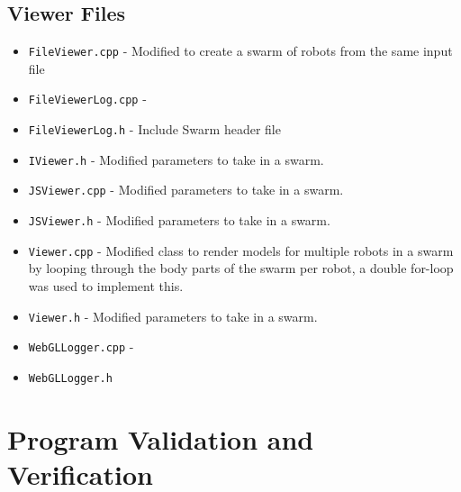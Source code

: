 \documentclass[11pt,a4paper]{article}
\begin{document}
\subsection{Viewer Files}
\begin{itemize}
    \item \texttt{FileViewer.cpp} - Modified to create a swarm of robots from
        the same input file
    \item \texttt{FileViewerLog.cpp} -
    \item \texttt{FileViewerLog.h} - Include Swarm header file
    \item \texttt{IViewer.h} - Modified parameters to take in a swarm.
    \item \texttt{JSViewer.cpp} - Modified parameters to take in a swarm.
    \item \texttt{JSViewer.h} - Modified parameters to take in a swarm.
    \item \texttt{Viewer.cpp} - Modified class to render models for multiple
        robots in a swarm by looping through the body parts of the swarm per
        robot, a double for-loop was used to implement this.
    \item \texttt{Viewer.h} - Modified parameters to take in a swarm.
    \item \texttt{WebGLLogger.cpp} -
    \item \texttt{WebGLLogger.h}
\end{itemize}

\section{Program Validation and Verification}
\label{s:progr-valid-verif}
%
%
%
\end{document}
